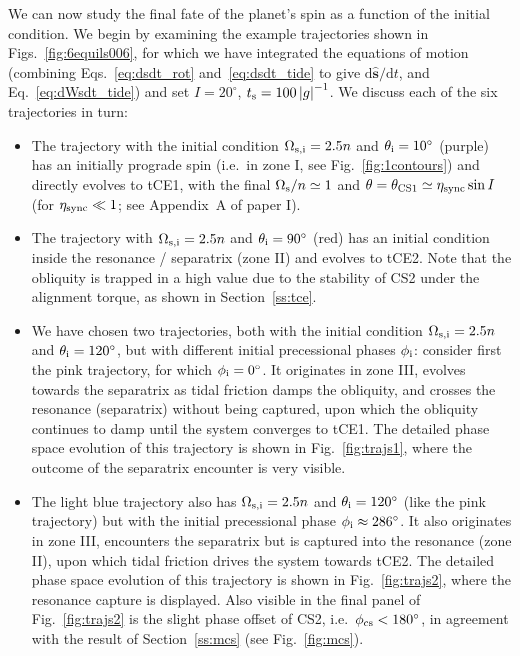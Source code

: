 \documentclass[
        fleqn,
        usenatbib,
        referee
    ]{mnras}
\newcommand*{\rdil}[2]{\mathrm{d}#1/\mathrm{d}#2}
\newcommand*{\abs}[1]{\left|#1\right|}
\newcommand*{\uv}[1]{\hat{\boldsymbol{\mathbf{#1}}}}
\begin{document}
We can now study the final fate of the planet's spin as a function of the
initial condition.
We begin by examining the example trajectories shown in
Figs.~\ref{fig:6equils006}, for which we have integrated
the equations of motion (combining Eqs.~\ref{eq:dsdt_rot}
and~\ref{eq:dsdt_tide} to give $\rdil{\uv{s}}{t}$, and Eq.~\ref{eq:dWsdt_tide})
and set $I = 20^\circ$, $t_{\rm s} = 100 \abs{g}^{-1}$. We discuss each of the
six trajectories in turn:
\begin{itemize}
    \item The trajectory with the initial condition $\Omega_{\rm s, i} = 2.5n$
        and $\theta_{\rm i} = 10^\circ$ (purple) has an initially prograde spin
        (i.e.\ in zone I, see Fig.~\ref{fig:1contours}) and directly evolves to
        tCE1, with the final $\Omega_{\rm s} / n \simeq 1$ and $\theta =
        \theta_{\rm CS1} \simeq \eta_{\rm sync} \sin I$ (for $\eta_{\rm sync}
        \ll 1$; see Appendix~A of paper I).

    \item The trajectory with $\Omega_{\rm s, i} = 2.5n$ and
        $\theta_{\rm i} = 90^\circ$ (red) has an initial condition inside the
        resonance / separatrix (zone II) and evolves to tCE2. Note that the
        obliquity is trapped in a high value due to the stability of CS2 under
        the alignment torque, as shown in Section~\ref{ss:tce}.

    \item We have chosen two trajectories, both with the initial condition
        $\Omega_{\rm s, i} = 2.5n$ and $\theta_{\rm i} = 120^\circ$, but with
        different initial precessional phases $\phi_{\rm i}$: consider first
        the pink trajectory, for which $\phi_{\rm i} = 0^\circ$. It originates
        in zone III, evolves towards the separatrix as tidal friction damps the
        obliquity, and crosses the resonance (separatrix) without being
        captured, upon which the obliquity continues to damp until the system
        converges to tCE1. The detailed phase space evolution of this trajectory
        is shown in Fig.~\ref{fig:trajs1}, where the outcome of the separatrix
        encounter is very visible.

    \item The light blue trajectory also has $\Omega_{\rm s, i} =
        2.5n$ and $\theta_{\rm i} = 120^\circ$ (like the pink trajectory) but
        with the initial precessional phase $\phi_{\rm i} \approx 286^\circ$.
        It also originates in zone III, encounters the separatrix but is
        captured into the resonance (zone II), upon which tidal friction drives
        the system towards tCE2. The detailed phase space evolution of this
        trajectory is shown in Fig.~\ref{fig:trajs2}, where the resonance
        capture is displayed. Also visible in the final panel of
        Fig.~\ref{fig:trajs2} is the slight phase offset of CS2, i.e.\
        $\phi_{\rm cs} < 180^\circ$, in agreement with the result of
        Section~\ref{ss:mcs} (see Fig.~\ref{fig:mcs}).


\end{itemize}
\end{document}
